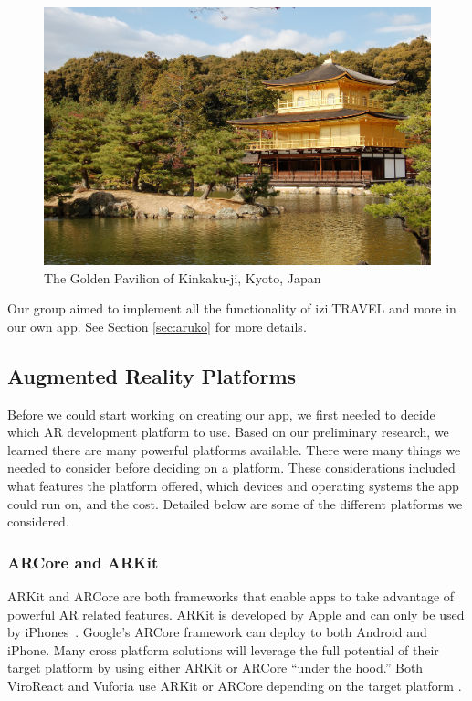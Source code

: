 \documentclass[a4paper, 10pt, american, titlepage]{article}
\begin{document}
\begin{figure}[h]
	\centering
	\includegraphics[width=\textwidth]{kinkakuji.jpg}
	\caption[The Golden Pavilion of Kinkaku-ji, Kyoto, Japan]{The Golden
		Pavilion of Kinkaku-ji, Kyoto, Japan~\autocite{davidson2005}}
	\label{fig:kinkakuji}
\end{figure}

Our group aimed to implement all the functionality of izi.TRAVEL and more in
our own app. See Section \ref{sec:aruko} for more details.

\subsection{Augmented Reality Platforms}
\label{sec:platforms}

Before we could start working on creating our app, we first needed to decide
which AR development platform to use. Based on our preliminary research, we
learned there are many powerful platforms available. There were many things we
needed to consider before deciding on a platform. These considerations included
what features the platform offered, which devices and operating systems the app
could run on, and the cost. Detailed below are some of the different platforms
we considered.

\subsubsection{ARCore and ARKit}
\label{sec:ARCoreAndARKit}

ARKit and ARCore are both frameworks that enable apps to take advantage of
powerful AR related features. ARKit is developed by Apple and can only be used
by iPhones~\autocite{summerson2018}. Google's ARCore framework can deploy to both
Android and iPhone. Many cross platform solutions will leverage the full
potential of their target platform by using either ARKit or ARCore ``under the
hood.'' Both ViroReact and Vuforia use ARKit or ARCore depending on the target
platform \autocites{vuforiaFusion}{moon2018}.
\end{document}
